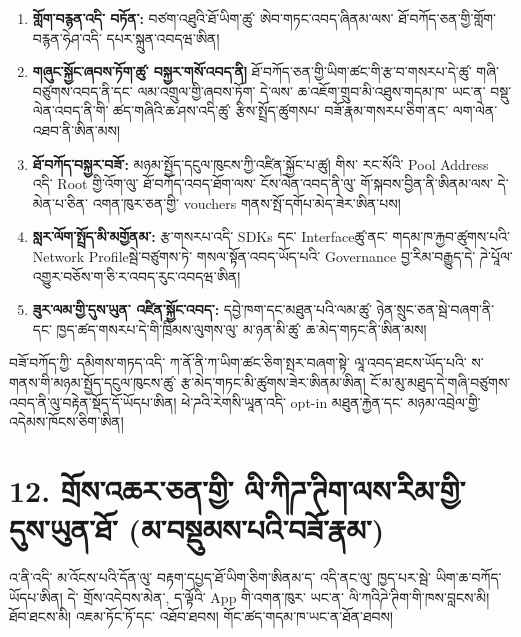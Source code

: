 \documentclass[11pt]{article}
\begin{document}
\begin{enumerate}[leftmargin=*]
\item \textbf{གློག་བརྙན་འདི་ བཏོན་:} བཙག་འཐུའི་ཐོ་ཡིག་ཚུ་ ཨེབ་གཏང་འབད་ཞིནམ་ལས་ ཐོ་བཀོད་ཅན་གྱི་གློག་བརྙན་ཧེཤ་འདི་ དཔར་སྐྲུན་འབདཝ་ཨིན།
\item \textbf{གཞུང་སྐྱོང་ཞབས་ཏོག་ཚུ་ བསྐྱར་གསོ་འབད་ནི།} ཐོ་བཀོད་ཅན་གྱི་ཡིག་ཚང་གི་རྩ་བ་གསརཔ་དེ་ཚུ་ གཞི་བཙུགས་འབད་ནི་དང་ ལམ་འགྲུལ་གྱི་ཞབས་ཏོག་ དེ་ལས་ ཆ་འཇོག་གྲུབ་མི་འཐུས་གདམ་ཁ་ ཡང་ན་ བསྡུ་ལེན་འབད་ནི་གི་ ཚད་གཞིའི་ཆ་ཤས་འདི་ཚུ་ རྩིས་སྤྲོད་ཚུགསཔ་ བཟོ་རྣམ་གསརཔ་ཅིག་ནང་ ལག་ལེན་འཐབ་ནི་ཨིན་མས།
\item \textbf{ཐོ་བཀོད་བསྐྱར་བཟོ་:} མཉམ་སྤྱོད་དངུལ་ཁུངས་ཀྱི་འཛིན་སྐྱོང་པ་ཚུ། གིས་ རང་སོའི་ Pool Address འདི་ Root གྱི་འོག་ལུ་ ཐོ་བཀོད་འབད་ཐོག་ལས་ ངོས་ལེན་འབད་ནི་ལུ་ གོ་སྐབས་བྱིན་ནི་ཨིནམ་ལས་ དེ་མེན་པ་ཅིན་ འགན་ཁུར་ཅན་གྱི་ vouchers གནས་སྤོ་དགོཔ་མེད་ཟེར་ཨིན་པས།
\item \textbf{སླར་ལོག་སྤྲོད་མི་མགྱོནམ་:} རྩ་གསརཔ་འདི་ SDKs དང་ Interfaceཚུ་ནང་ གདམ་ཁ་རྐྱབ་ཚུགས་པའི་ Network Profileསྦེ་བཙུགས་ཏེ་ གསལ་སྟོན་འབད་ཡོད་པའི་ Governance བྱ་རིམ་བརྒྱུད་དེ་ ཌེ་པཱོལ་འགྱུར་བཅོས་ག་ཅི་ར་འབད་རུང་འབདཝ་ཨིན།
\item \textbf{ཟུར་ལམ་གྱི་དུས་ཡུན་ འཛིན་སྐྱོང་འབད་:} དབྱེ་ཁག་དང་མཐུན་པའི་ལམ་ཚུ་ ཉེན་སྲུང་ཅན་སྦེ་བཞག་ནི་དང་ ཁྱད་ཚད་གསརཔ་དེ་གི་ཁྲིམས་ལུགས་ལུ་ མ་ཉན་མི་ཚུ་ ཆ་མེད་གཏང་ནི་ཨིན་མས།
\end{enumerate}
བཟོ་བཀོད་ཀྱི་ དམིགས་གཏད་འདི་ ཀ་ནོ་ནི་ཀ་ཡིག་ཚང་ཅིག་སྤར་བཞག་སྟེ་ ལཱ་འབད་ཐངས་ཡོད་པའི་ ས་གནས་གི་མཉམ་སྤྱོད་དངུལ་ཁུངས་ཚུ་ རྩ་མེད་གཏང་མི་ཚུགས་ཟེར་ཨིནམ་ཨིན། ངོ་མ་མུ་མཐུད་དེ་གཞི་བཙུགས་འབད་ནི་ལུ་བརྟེན་སྡོད་དོ་ཡོདཔ་ཨིན། ཕེ་ཌའི་རེགསི་ཡཱན་འདི་ opt-in མཐུན་རྐྱེན་དང་ མཉམ་འབྲེལ་གྱི་འདེམས་ཁོངས་ཅིག་ཨིན།


\section*{12. གྲོས་འཆར་ཅན་གྱི་ ལི་ཀིཌ་ཊིག་ལས་རིམ་གྱི་ དུས་ཡུན་ཐོ་ (མ་བསྡུམས་པའི་བཟོ་རྣམ་)}

འ་ནི་འདི་ མ་འོངས་པའི་དོན་ལུ་ བརྟག་དཔྱད་ཐོ་ཡིག་ཅིག་ཨིནམ་ད་ འདི་ནང་ལུ་ ཁྱད་པར་སྦེ་ ཡིག་ཆ་བཀོད་ཡོདཔ་ཨིན། དེ་ གྲོས་འདེབས་མེན་, ད་ལྟོའི་ App གི་འགན་ཁུར་ ཡང་ན་ ལི་ཀའིཌེ་ཊིག་གི་ཁས་བླངས་མི། ཐོབ་ཐངས་མི། འཇམ་ཏོང་ཏོ་དང་ འཐོབ་ཐབས། གོང་ཚད་གདམ་ཁ་ཡང་ན་ཐོན་ཐབས།
\end{document}
